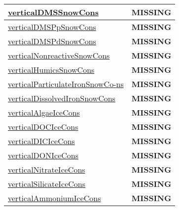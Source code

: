 {\begin{center}
\begin{longtable}{| p{2.0in} | p{4.0in} |}
    \hline
    \hyperref[subsec:var_sec_tracer_conservation_verticalDMSSnowCons]{verticalDMSSnowCons} & {\bf \color{red} MISSING} \\
    \hline
    \hyperref[subsec:var_sec_tracer_conservation_verticalDMSPpSnowCons]{verticalDMSPpSnowCons} & {\bf \color{red} MISSING} \\
    \hline
    \hyperref[subsec:var_sec_tracer_conservation_verticalDMSPdSnowCons]{verticalDMSPdSnowCons} & {\bf \color{red} MISSING} \\
    \hline
    \hyperref[subsec:var_sec_tracer_conservation_verticalNonreactiveSnowCons]{verticalNonreactiveSnowCons} & {\bf \color{red} MISSING} \\
    \hline
    \hyperref[subsec:var_sec_tracer_conservation_verticalHumicsSnowCons]{verticalHumicsSnowCons} & {\bf \color{red} MISSING} \\
    \hline
    \hyperref[subsec:var_sec_tracer_conservation_verticalParticulateIronSnowCons]{verticalParticulateIronSnowCo-}\hyperref[subsec:var_sec_tracer_conservation_verticalParticulateIronSnowCons]{ns  }& {\bf \color{red} MISSING} \\
    \hline
    \hyperref[subsec:var_sec_tracer_conservation_verticalDissolvedIronSnowCons]{verticalDissolvedIronSnowCons} & {\bf \color{red} MISSING} \\
    \hline
    \hyperref[subsec:var_sec_tracer_conservation_verticalAlgaeIceCons]{verticalAlgaeIceCons} & {\bf \color{red} MISSING} \\
    \hline
    \hyperref[subsec:var_sec_tracer_conservation_verticalDOCIceCons]{verticalDOCIceCons} & {\bf \color{red} MISSING} \\
    \hline
    \hyperref[subsec:var_sec_tracer_conservation_verticalDICIceCons]{verticalDICIceCons} & {\bf \color{red} MISSING} \\
    \hline
    \hyperref[subsec:var_sec_tracer_conservation_verticalDONIceCons]{verticalDONIceCons} & {\bf \color{red} MISSING} \\
    \hline
    \hyperref[subsec:var_sec_tracer_conservation_verticalNitrateIceCons]{verticalNitrateIceCons} & {\bf \color{red} MISSING} \\
    \hline
    \hyperref[subsec:var_sec_tracer_conservation_verticalSilicateIceCons]{verticalSilicateIceCons} & {\bf \color{red} MISSING} \\
    \hline
    \hyperref[subsec:var_sec_tracer_conservation_verticalAmmoniumIceCons]{verticalAmmoniumIceCons} & {\bf \color{red} MISSING} \\
    \hline

\end{longtable}
\end{center}}
